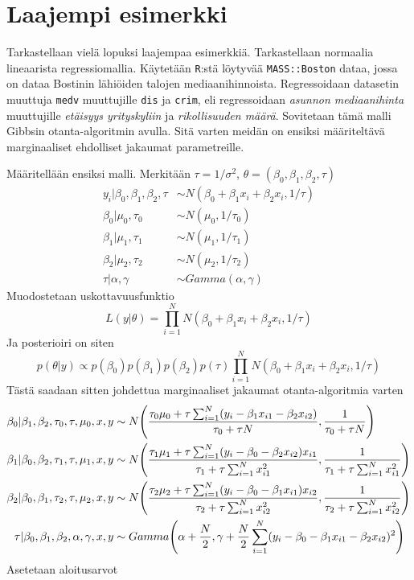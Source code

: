 \chapter{Laajempi esimerkki}

Tarkastellaan vielä lopuksi laajempaa esimerkkiä. Tarkastellaan normaalia lineaarista regressiomallia. Käytetään \texttt{R}:stä löytyvää \texttt{MASS::Boston} dataa, jossa on dataa Bostinin lähiöiden talojen mediaanihinnoista. Regressoidaan datasetin muuttuja \texttt{medv} muuttujille \texttt{dis} ja \texttt{crim}, eli regressoidaan \textit{asunnon mediaanihinta} muuttujille \textit{etäisyys yrityskyliin} ja \textit{rikollisuuden määrä}. Sovitetaan tämä malli Gibbsin otanta-algoritmin avulla. Sitä varten meidän on ensiksi määriteltävä marginaaliset ehdolliset jakaumat parametreille.

Määritellään ensiksi malli. Merkitään $\tau = 1/\sigma^2$, $\theta = (\beta_0,\beta_1,\beta_2,\tau)$
\begin{equation}
\begin{split}
	y_i|\beta_0,\beta_1,\beta_2,\tau &\sim N(\beta_0+\beta_1 x_i+\beta_2x_i, 1/\tau) \\
	\beta_0|\mu_0,\tau_0 &\sim N(\mu_0, 1/\tau_0) \\
	\beta_1|\mu_1,\tau_1 &\sim N(\mu_1, 1/\tau_1) \\
	\beta_2|\mu_2,\tau_2 &\sim N(\mu_2, 1/\tau_2) \\
	\tau|\alpha, \gamma &\sim Gamma(\alpha, \gamma)
\end{split}	
\end{equation}
Muodostetaan uskottavuusfunktio
\begin{equation}
	L(y|\theta) = \prod_{i=1}^{N} N(\beta_0+\beta_1 x_i+\beta_2x_i, 1/\tau)
\end{equation}
Ja posterioiri on siten 
\begin{equation}
	p(\theta|y) \propto p(\beta_0)p(\beta_1)p(\beta_2)p(\tau)\prod_{i=1}^{N} N(\beta_0+\beta_1 x_i+\beta_2x_i, 1/\tau)
\end{equation}
Tästä saadaan sitten johdettua marginaaliset jakaumat otanta-algoritmia varten
\begin{equation}
\begin{split}
	\beta_0 | \beta_1,\beta_2,\tau_0,\tau,\mu_0,x,y &\sim 
	N\pqty{\frac{\tau_0\mu_0+\tau\sum_{i=1}^{N}(y_i-\beta_1x_{i1}-\beta_2x_{i2})}{\tau_0+\tau N}, \frac{1}{\tau_0+\tau N}} \\
	\beta_1 | \beta_0,\beta_2,\tau_1,\tau,\mu_1,x,y &\sim 
	N\pqty{\frac{\tau_1\mu_1+\tau\sum_{i=1}^{N}(y_i-\beta_0-\beta_2x_{i2})x_{i1}}{\tau_1+\tau\sum_{i=1}^{N}x_{i1}^2}, \frac{1}{\tau_1+\tau\sum_{i=1}^{N}x_{i1}^2}}\\
	\beta_2 | \beta_0,\beta_1,\tau_2,\tau,\mu_2,x,y &\sim 
	N\pqty{\frac{\tau_2\mu_2+\tau\sum_{i=1}^{N}(y_i-\beta_0-\beta_1x_{i1})x_{i2}}{\tau_2+\tau\sum_{i=1}^{N}x_{i2}^2}, \frac{1}{\tau_2+\tau\sum_{i=1}^{N}x_{i2}^2}}\\
	\tau | \beta_0,\beta_1,\beta_2,\alpha,\gamma,x,y &\sim 
	Gamma\pqty{\alpha+\frac{N}{2},\gamma + \frac{N}{2}\sum_{i=1}^{N}(y_i-\beta_0-\beta_1x_{i1}-\beta_2x_{i2})^2}
\end{split}
\end{equation}
Asetetaan aloitusarvot